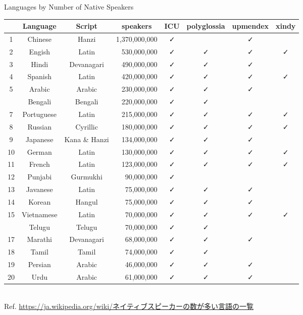 \documentclass[aspectratio=169,10pt]{beamer}
\newcommand{\colRd}{\color{purple}}
\newcommand{\colGn}{\color{teal}}
\newcommand{\colBl}{\color{blue}}
\begin{document}
\begin{frame}{Languages by Number of Native Speakers}

\setlength\dashlinedash{0.5pt}
\setlength\dashlinegap{1.0pt}

\begin{center}
\scriptsize
\begin{tabular}{ccc|r|cccc}
  & Language    & Script & \multicolumn{1}{c|}{speakers} & ICU & polyglossia & upmendex & xindy \\\hline\hline
1 & Chinese     & {\colRd Hanzi     } & 1,370,000,000 & ✓ &    & ✓ &    \\
2 & Engish      & Latin      &   530,000,000 & ✓ & ✓ & ✓ & ✓ \\
3 & Hindi       & {\colBl Devanagari} &   490,000,000 & ✓ & ✓ & ✓ &    \\
4 & Spanish     & Latin      &   420,000,000 & ✓ & ✓ & ✓ & ✓ \\
5 & Arabic      & {\colGn Arabic    } &   230,000,000 & ✓ & ✓ & ✓ &    \\\hdashline
6 & Bengali     & {\colBl Bengali   } &   220,000,000 & ✓ & ✓ &    &    \\
7 & Portuguese  & Latin      &   215,000,000 & ✓ & ✓ & ✓ & ✓ \\
8 & Russian     & Cyrillic   &   180,000,000 & ✓ & ✓ & ✓ & ✓ \\
9 & Japanese    & {\colRd Kana \& Hanzi } &   134,000,000 & ✓ & ✓ & ✓ &    \\
10 & German     & Latin      &   130,000,000 & ✓ & ✓ & ✓ & ✓ \\\hline
11 & French     & Latin      &   123,000,000 & ✓ & ✓ & ✓ & ✓ \\
12 & Punjabi    & {\colBl Gurmukhi  } &    90,000,000 & ✓ &    &    &    \\
13 & Javanese   & Latin      &    75,000,000 & ✓ & ✓ & ✓ &    \\
14 & Korean     & {\colRd Hangul    } &    75,000,000 & ✓ & ✓ & ✓ &    \\
15 & Vietnamese & Latin      &    70,000,000 & ✓ & ✓ & ✓ & ✓ \\\hdashline
16 & Telugu     & {\colBl Telugu    } &    70,000,000 & ✓ & ✓ &    &    \\
17 & Marathi    & {\colBl Devanagari} &    68,000,000 & ✓ & ✓ & ✓ &    \\
18 & Tamil      & {\colBl Tamil     } &    74,000,000 & ✓ & ✓ &    &    \\
19 & Persian    & {\colGn Arabic    } &    46,000,000 & ✓ & ✓ & ✓ &    \\
20 & Urdu       & {\colGn Arabic    } &    61,000,000 & ✓ & ✓ & ✓ &    \\\hline
\end{tabular}
\\
{\tiny Ref. \url{https://ja.wikipedia.org/wiki/ネイティブスピーカーの数が多い言語の一覧}}
\end{center}
\end{frame}
\end{document}
